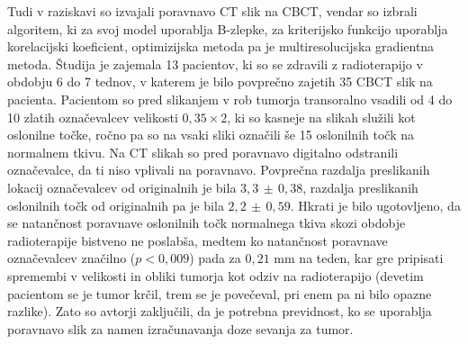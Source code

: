 \documentclass[journal]{IEEEtran}
\begin{document}
Tudi v raziskavi \cite{mencarelli2014} so izvajali poravnavo CT slik na CBCT, vendar so izbrali algoritem, ki za svoj model uporablja B-zlepke, za kriterijsko funkcijo uporablja korelacijski koeficient, optimizijska metoda pa je multiresolucijska gradientna metoda. Študija je zajemala 13 pacientov, ki so se zdravili z radioterapijo v obdobju 6 do 7 tednov, v katerem je bilo povprečno zajetih 35 CBCT slik na pacienta. Pacientom so pred slikanjem v rob tumorja transoralno vsadili od 4 do 10 zlatih označevalcev velikosti $0{,}35\times 2$, ki so kasneje na slikah služili kot oslonilne točke, ročno pa so na vsaki sliki označili še 15 oslonilnih točk na normalnem tkivu. Na CT slikah so pred poravnavo digitalno odstranili označevalce, da ti niso vplivali na poravnavo. Povprečna razdalja preslikanih lokacij označevalcev od originalnih je bila $3{,}3\,\pm\,0{,}38$, razdalja preslikanih oslonilnih točk od originalnih pa je bila $2{,}2\,\pm\,0{,}59$. Hkrati je bilo ugotovljeno, da se natančnost poravnave oslonilnih točk normalnega tkiva skozi obdobje radioterapije bistveno ne poslabša, medtem ko natančnost poravnave označevalcev značilno ($p<0{,}009$) pada za $0{,}21$ mm na teden, kar gre pripisati spremembi v velikosti in obliki tumorja kot odziv na radioterapijo (devetim pacientom se je tumor krčil, trem se je povečeval, pri enem pa ni bilo opazne razlike). Zato so avtorji zaključili, da je potrebna previdnost, ko se uporablja poravnavo slik za namen izračunavanja doze sevanja za tumor.





\begin{comment}
Za kvantitativno ovrednotenje kvalitete poravnave se uporablja več različnih kriterijev. Med najpogosteje uporabljenimi sta mera DICE (angl. DICE similarity measure) ter modificirana Hausdorffova razdalja, ki računa razdaljo med ploskvami segmentiranih anatomskih struktur:
\begin{equation}
 H = frac{1}{n}\min_{x\in A,\ y\in B} d(x,y)
\end{equation}
Mera DICE je izražena z enačbo
\begin{equation}
 D = \frac{2|A\cap B|}{|A| + |B|},
\end{equation}
kjer $|\cdot|$ označuje moč množice, $A$ je množica vokslov, ki pipada prvi segmentirani anatomski strukturi, $B$ pa je množica vokslov, ki pipada drugi anatomski strukturi. DICE doseže vrednost 1,
ko se anatomski strukturi na sliki popolnoma prekrivata, nižje vrednosti pa pomenijo slabšo poravnavo. Hausdorffova razdalja pa doseže nizke vrednosti za popolne poravnave ter višje vrednosti za nepopolne; idealno je 0. Rezultati v meri dice se lahko precej razlikujejo glede na različne anatomske strukture. Za strukture, ki imajo večje razmerje med površino in volumnom (npr. hrbtenjača) je značilno, da je mera dice nekoliko nižja, zato tu ne gre pričakovati visokih rezultatov. Za tovrstne anatomske strukture je bolje uporabiti Hausdorffovo razdaljo.
\end{comment}
\end{document}
